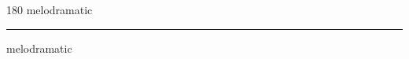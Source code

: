 
\begin{frame}
\begin{center}
\begin{turn}{180}
{\fontsize{2.5cm}{1em}\selectfont melodramatic}
\end{turn}
\vspace{1em}\par  
\hrule
\vspace{1em}\par  
{\fontsize{2.5cm}{1em}\selectfont melodramatic}
\end{center}
\end{frame}
